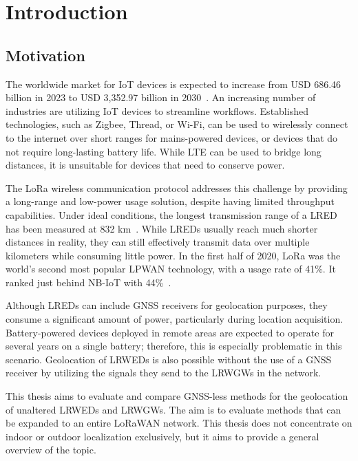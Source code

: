 \chapter{Introduction}

\section{Motivation}

The worldwide market for \ac{IoT} devices is expected to increase from USD 686.46 billion in 2023 to USD 3,352.97 billion in 2030~\cite{statista_industrial_2023}.
An increasing number of industries are utilizing \ac{IoT} devices to streamline workflows.
Established technologies, such as Zigbee, Thread, or Wi-Fi, can be used to wirelessly connect to the internet over short ranges for mains-powered devices, or devices that do not require long-lasting battery life.
While \ac{LTE} can be used to bridge long distances, it is unsuitable for devices that need to conserve power.

The \ac{LoRa} wireless communication protocol addresses this challenge by providing a long-range and low-power usage solution, despite having limited throughput capabilities.
Under ideal conditions, the longest transmission range of a \acl{LRED} has been measured at 832 km~\cite{the_things_network_global_team_lora_nodate}.
While \aclp{LRED} usually reach much shorter distances in reality, they can still effectively transmit data over multiple kilometers while consuming little power.
In the first half of 2020, \ac{LoRa} was the world's second most popular \ac{LPWAN} technology, with a usage rate of 41\%.
It ranked just behind NB-IoT with 44\%~\cite{iot_analytics_lpwa_2020}.

Although \aclp{LRED} can include \ac{GNSS} receivers for geolocation purposes, they consume a significant amount of power, particularly during location acquisition.
Battery-powered devices deployed in remote areas are expected to operate for several years on a single battery; therefore, this is especially problematic in this scenario.
Geolocation of \aclp{LRWED} is also possible without the use of a \ac{GNSS} receiver by utilizing the signals they send to the \aclp{LRWGW} in the network.

This thesis aims to evaluate and compare \ac{GNSS}-less methods for the geolocation of unaltered \aclp{LRWED} and \aclp{LRWGW}.
The aim is to evaluate methods that can be expanded to an entire \ac{LoRaWAN} network.
This thesis does not concentrate on indoor or outdoor localization exclusively, but it aims to provide a general overview of the topic.

